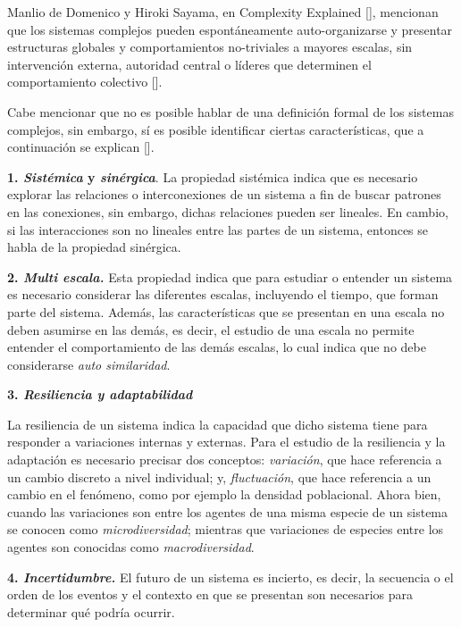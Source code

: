 \documentclass[../main.tex]{subfiles}
\begin{document}
Manlio de Domenico y Hiroki Sayama, en Complexity Explained [\cite{complejidad_explicada}], mencionan que los sistemas complejos   pueden espontáneamente auto-organizarse y presentar
estructuras globales y comportamientos no-triviales a mayores
escalas, sin intervención externa, autoridad central o líderes que
determinen el comportamiento colectivo [\cite{complejidad_explicada}]. 

Cabe mencionar que no es posible hablar de una definición formal de los sistemas complejos, sin embargo,  sí es posible identificar ciertas características, que a continuación se explican [\cite{Boulton2015-rb}].

\textbf{1. \textit{Sistémica} y \textit{sinérgica}}. La propiedad sistémica indica que es necesario explorar las relaciones o interconexiones de un sistema a fin de buscar patrones en las conexiones, sin embargo, dichas relaciones pueden ser lineales. En cambio, si las interacciones son no lineales entre las partes de un sistema, entonces se habla de la propiedad sinérgica.

\textbf{2. \textit{Multi escala.}}
Esta propiedad indica que para estudiar o entender un sistema es necesario considerar las diferentes escalas, incluyendo el tiempo, que forman parte del sistema. Además, las características que se presentan en una escala no deben asumirse en las demás, es decir, el estudio de una escala no permite entender el comportamiento de las demás escalas, lo cual indica que no debe considerarse \textit{auto similaridad}. 

\textbf{3. \textit{Resiliencia y adaptabilidad}}


La resiliencia de un sistema indica la capacidad que dicho sistema tiene para responder a variaciones internas y externas. Para el estudio de la resiliencia y la adaptación es necesario precisar dos conceptos:  \textit{variación}, que hace referencia a un cambio discreto a nivel individual; y,  \textit{fluctuación}, que hace referencia a un cambio en el fenómeno, como por ejemplo la densidad poblacional. Ahora bien, cuando las variaciones son entre los agentes de una misma especie de un sistema se conocen como \textit{microdiversidad}; mientras que variaciones de especies entre los agentes son conocidas como \textit{macrodiversidad}. 




\textbf{4. \textit{Incertidumbre.} } %
El futuro de un sistema es incierto, es decir, la secuencia o el orden de los eventos y el contexto en que se presentan son necesarios para determinar qué podría ocurrir.
\end{document}
